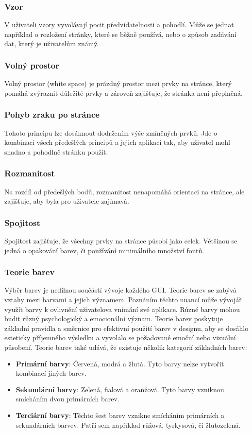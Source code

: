 \subsubsection*{Vzor}
V uživateli vzory vyvolávají pocit předvídatelnosti a pohodlí. Může se jednat například o rozložení stránky, které se běžně používá, nebo o způsob zadávání dat, který je uživatelům známý.

\subsubsection*{Volný prostor}
Volný prostor (white space) je prázdný prostor mezi prvky na stránce, který pomáhá zvýraznit důležité prvky a zároveň zajišťuje, že stránka není přeplněná.

\subsubsection*{Pohyb zraku po stránce}
Tohoto principu lze dosáhnout dodržením výše zmíněných prvků. Jde o kombinaci všech předešlých principů a jejich aplikaci tak, aby uživatel mohl snadno a pohodlně stránku použít.

\subsubsection*{Rozmanitost}
Na rozdíl od předešlých bodů, rozmanitost nenapomáhá orientaci na stránce, ale zajišťuje, aby byla pro uživatele zajímavá.

\subsubsection*{Spojitost}
Spojitost zajišťuje, že všechny prvky na stránce působí jako celek. Většinou se jedná o opakování barev, či používání minimálního množství fontů.

\subsubsection{Teorie barev}
Výběr barev je nedílnou součástí vývoje každého GUI. Teorie barev se zabývá vztahy mezi barvami a jejich významem. Poznáním těchto nuancí může vývojář využít barvy k ovlivnění uživatelova vnímání své aplikace. Různé barvy mohou budit různý psychologický a emocionální význam. Teorie barev poskytuje základní pravidla a směrnice pro efektivní použití barev v designu, aby se dosáhlo esteticky příjemného výsledku a vyvolalo se požadované emoční nebo vizuální působení. Teorie barev také udává, že existuje několik kategorií základních barev:
\begin{itemize}
    \item \textbf{Primární barvy}: Červená, modrá a žlutá. Tyto barvy nelze vytvořit kombinací jiných barev.
    \item \textbf{Sekundární barvy}: Zelená, fialová a oranžová. Tyto barvy vzniknou smícháním dvou primárních barev.
    \item \textbf{Terciární barvy}: Těchto šest barev vznikne smícháním primárních a sekundárních barvev. Patří sem například růžová, tyrkysová, či žlutozelená.
\end{itemize}

